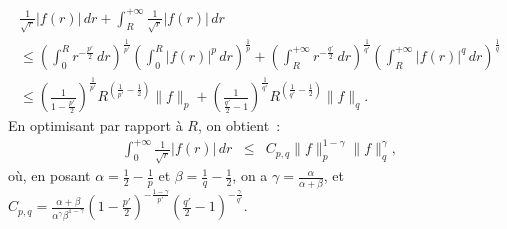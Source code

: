{\begin{enumerate}
{\begin{eqnarray*}
\frac{1}{\sqrt{r}} |f(r)|\,dr + \int_{R}^{+\infty}
\frac{1}{\sqrt{r}} |f(r)|\,dr\\
\leq \left( \int_{0}^{R}
r^{-\frac{p'}{2}}\,dr\right)^{\frac{1}{p'}} \left(\int_{0}^{R}
|f(r)|^{p} \,dr\right)^{\frac{1}{p}} + \left(\int_{R}^{+\infty}
r^{-\frac{q'}{2}}\,dr \right)^{\frac{1}{q'}} \left(
\int_{R}^{+\infty}
|f(r)|^{q}\,dr\right)^{\frac{1}{q}}\\
 \leq  \left(\frac{1}{1-\frac{p'}{2}}\right)^{\frac{1}{p'}}
R^{\left(\frac{1}{p'}-\frac{1}{2}\right)}\|f\|_{p} +
\left(\frac{1}{\frac{q'}{2} - 1}\right)^{\frac{1}{q'}}
R^{\left(\frac{1}{q'}-\frac{1}{2}\right)} \|f\|_{q}.
\end{eqnarray*}
En optimisant par rapport \`a $R$, on obtient~:
\begin{eqnarray*}
\int_{0}^{+\infty} \frac{1}{\sqrt{r}} |f(r)|\,dr &\leq & C_{p,q}
\|f\|_{p}^{1-\gamma}\|f\|_{q}^{\gamma},
\end{eqnarray*}
o\`u, en posant $\alpha =  \frac{1}{2}- \frac{1}{p}$ et $\beta =
 \frac{1}{q} - \frac{1}{2}$, on a $\gamma =
\frac{\alpha}{\alpha+\beta}$, et $C_{p,q} = \frac{\alpha +
\beta}{\alpha^{\gamma} \beta^{1-\gamma}}\left(1-\frac{p'}{2}
\right)^{-\frac{1-\gamma}{p'}}\left(\frac{q'}{2} - 1
\right)^{-\frac{\gamma}{q'}}$.}
\end{enumerate}
}
